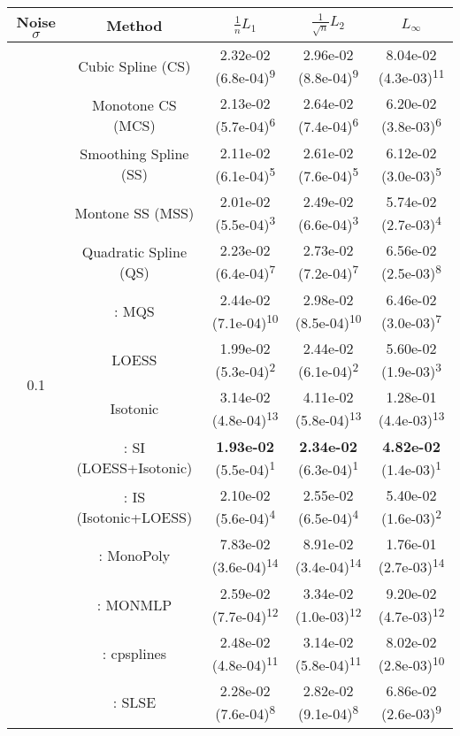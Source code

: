 \begin{tabular}{ccccc}
\toprule
Noise $\sigma$ & Method&$\frac 1n L_1$&$\frac{1}{\sqrt n}L_2$&$L_\infty$\tabularnewline
\midrule
\multirow{14}{*}{0.1}&Cubic Spline (CS)& 2.32e-02 (6.8e-04)\textsuperscript{9}& 2.96e-02 (8.8e-04)\textsuperscript{9}& 8.04e-02 (4.3e-03)\textsuperscript{11}\tabularnewline
&Monotone CS (MCS)& 2.13e-02 (5.7e-04)\textsuperscript{6}& 2.64e-02 (7.4e-04)\textsuperscript{6}& 6.20e-02 (3.8e-03)\textsuperscript{6}\tabularnewline
&Smoothing Spline (SS)& 2.11e-02 (6.1e-04)\textsuperscript{5}& 2.61e-02 (7.6e-04)\textsuperscript{5}& 6.12e-02 (3.0e-03)\textsuperscript{5}\tabularnewline
&Montone SS (MSS)& 2.01e-02 (5.5e-04)\textsuperscript{3}& 2.49e-02 (6.6e-04)\textsuperscript{3}& 5.74e-02 (2.7e-03)\textsuperscript{4}\tabularnewline
&Quadratic Spline (QS)& 2.23e-02 (6.4e-04)\textsuperscript{7}& 2.73e-02 (7.2e-04)\textsuperscript{7}& 6.56e-02 (2.5e-03)\textsuperscript{8}\tabularnewline
&\textcite{heMonotoneBsplineSmoothing1998}: MQS& 2.44e-02 (7.1e-04)\textsuperscript{10}& 2.98e-02 (8.5e-04)\textsuperscript{10}& 6.46e-02 (3.0e-03)\textsuperscript{7}\tabularnewline
&LOESS& 1.99e-02 (5.3e-04)\textsuperscript{2}& 2.44e-02 (6.1e-04)\textsuperscript{2}& 5.60e-02 (1.9e-03)\textsuperscript{3}\tabularnewline
&Isotonic& 3.14e-02 (4.8e-04)\textsuperscript{13}& 4.11e-02 (5.8e-04)\textsuperscript{13}& 1.28e-01 (4.4e-03)\textsuperscript{13}\tabularnewline
&\textcite{mammenEstimatingSmoothMonotone1991}: SI (LOESS+Isotonic)& \textbf{1.93e-02} (5.5e-04)\textsuperscript{1}& \textbf{2.34e-02} (6.3e-04)\textsuperscript{1}& \textbf{4.82e-02} (1.4e-03)\textsuperscript{1}\tabularnewline
&\textcite{mammenEstimatingSmoothMonotone1991}: IS (Isotonic+LOESS)& 2.10e-02 (5.6e-04)\textsuperscript{4}& 2.55e-02 (6.5e-04)\textsuperscript{4}& 5.40e-02 (1.6e-03)\textsuperscript{2}\tabularnewline
&\textcite{murrayFastFlexibleMethods2016a}: MonoPoly& 7.83e-02 (3.6e-04)\textsuperscript{14}& 8.91e-02 (3.4e-04)\textsuperscript{14}& 1.76e-01 (2.7e-03)\textsuperscript{14}\tabularnewline
&\textcite{cannonMonmlpMultilayerPerceptron2017}: MONMLP& 2.59e-02 (7.7e-04)\textsuperscript{12}& 3.34e-02 (1.0e-03)\textsuperscript{12}& 9.20e-02 (4.7e-03)\textsuperscript{12}\tabularnewline
&\textcite{navarro-garciaConstrainedSmoothingOutofrange2023}: cpsplines& 2.48e-02 (4.8e-04)\textsuperscript{11}& 3.14e-02 (5.8e-04)\textsuperscript{11}& 8.02e-02 (2.8e-03)\textsuperscript{10}\tabularnewline
&\textcite{groeneboomConfidenceIntervalsMonotone2023}: SLSE& 2.28e-02 (7.6e-04)\textsuperscript{8}& 2.82e-02 (9.1e-04)\textsuperscript{8}& 6.86e-02 (2.6e-03)\textsuperscript{9}\tabularnewline

\end{tabular}

